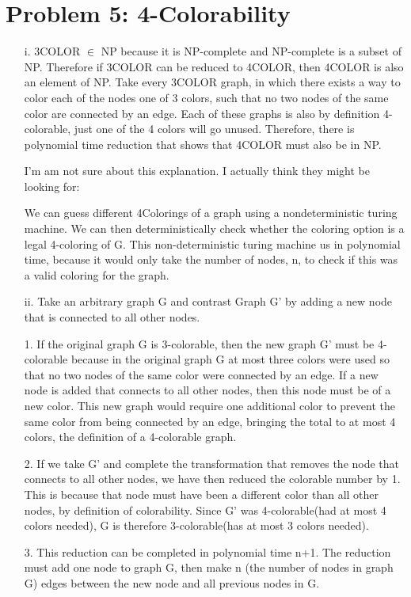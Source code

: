 \documentclass[10pt,letter]{article}
\begin{document}
\section*{Problem 5: 4-Colorability}
\begin{enumerate}
\item[i.] 3COLOR $\in$ NP because it is NP-complete and NP-complete is a subset of NP. Therefore if 3COLOR can be reduced to 4COLOR, then 4COLOR is also an element of NP. Take every 3COLOR graph, in which there exists a way to color each of the nodes one of 3 colors, such that no two nodes of the same color are connected by an edge. Each of these graphs is also by definition 4-colorable, just one of the 4 colors will go unused. Therefore, there is polynomial time reduction that shows that 4COLOR must also be in NP. 

I'm am not sure about this explanation. I actually think they might be looking for: 

We can guess different 4Colorings of a graph using a nondeterministic turing machine. We can then deterministically check whether the coloring option is a legal 4-coloring of G. This non-deterministic turing machine us in polynomial time, because it would only take the number of nodes, n, to check if this was a valid coloring for the graph. 
\item[ii.]
Take an arbitrary graph G and contrast Graph G' by adding a new node that is connected to all other nodes. 
\item[1.] If the original graph G is 3-colorable, then the new graph G' must be 4-colorable because in the original graph G at most three colors were used so that no two nodes of the same color were connected by an edge. If a new node is added that connects to all other nodes, then this node must be of a new color. This new graph would require one additional color to prevent the same color from being connected by an edge, bringing the total to at most 4 colors, the definition of  a 4-colorable graph. 
\item[2.]
If we take G' and complete the transformation that removes the node that connects to all other nodes, we have then reduced the colorable number by 1. This is because that node must have been a different color than all other nodes, by definition of colorability. Since G' was 4-colorable(had at most 4 colors needed), G is therefore 3-colorable(has at most 3 colors needed). 
\item[3.]
This reduction can be completed in polynomial time n+1. The reduction must add one node to graph G, then make n (the number of nodes in graph G) edges between the new node and all previous nodes in G. 
\end{enumerate}
\end{document}
